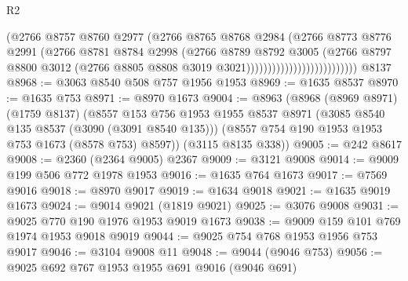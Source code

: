 \begin{lexlean}{R2}
\begin{coremodule}
                                          (@2766
                                            @8757
                                            @8760
                                            @2977
                                            (@2766
                                              @8765
                                              @8768
                                              @2984
                                              (@2766
                                                @8773
                                                @8776
                                                @2991
                                                (@2766
                                                  @8781
                                                  @8784
                                                  @2998
                                                  (@2766
                                                    @8789
                                                    @8792
                                                    @3005
                                                    (@2766
                                                      @8797
                                                      @8800
                                                      @3012
                                                      (@2766
                                                        @8805
                                                        @8808
                                                        @3019
                                                        @3021))))))))))))))))))))))))))
    @8137
@8968 := @3063 @8540 @508 @757 @1956 @1953
@8969 := @1635 @8537
@8970 := @1635 @753
@8971 := @8970 @1673
@9004 := @8963
    (@8968
      (@8969 @8971)
      (@1759 @8137)
      (@8557
        @153
        @756
        @1953
        @1955
        @8537
        @8971
        (@3085 @8540 @135 @8537 (@3090 (@3091 @8540 @135)))
        (@8557 @754 @190 @1953 @1953 @753 @1673 (@8578 @753) @8597))
      (@3115 @8135 @338))
@9005 := @242 @8617
@9008 := @2360 (@2364 @9005) @2367
@9009 := @3121 @9008
@9014 := @9009 @199 @506 @772 @1978 @1953
@9016 := @1635 @764 @1673
@9017 := @7569 @9016
@9018 := @8970 @9017
@9019 := @1634 @9018
@9021 := @1635 @9019 @1673
@9024 := @9014 @9021 (@1819 @9021)
@9025 := @3076 @9008
@9031 := @9025 @770 @190 @1976 @1953 @9019 @1673
@9038 := @9009 @159 @101 @769 @1974 @1953 @9018 @9019
@9044 := @9025 @754 @768 @1953 @1956 @753 @9017
@9046 := @3104 @9008 @11
@9048 := @9044 (@9046 @753)
@9056 := @9025 @692 @767 @1953 @1955 @691 @9016 (@9046 @691)

\end{coremodule}
\end{lexlean}
